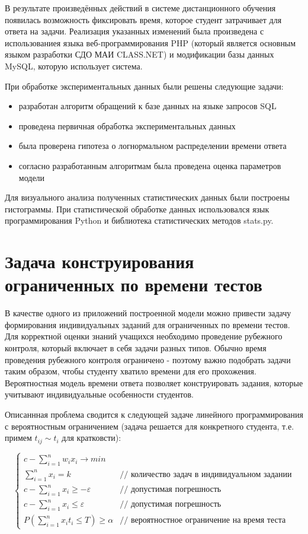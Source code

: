 В результате произведённых действий в системе дистанционного обучения появилась возможность фиксировать время, которое студент затрачивает для ответа на задачи. Реализация указанных изменений была произведена с ис\-пользованиея языка веб-программирования PHP (который является основным языком разработки СДО МАИ CLASS.NET) и модификации базы данных MySQL, которую использует система.

При обработке экспериментальных данных были решены следующие за\-дачи:

\begin{itemize}
\item разработан алгоритм обращений к базе данных на языке запросов SQL
\item проведена первичная обработка экспериментальных данных
\item была проверена гипотеза о логнормальном распределении времени от\-вета
\item согласно разработанным алгоритмам была проведена оценка парамет\-ров модели
\end{itemize}

Для визуального анализа полученных статистических данных были пос\-троены гисто\-граммы. При статистической обработке данных использовался язык программирования Python и библиотека статистических методов stats.py.

\section{Задача конструирования ограниченных по времени тестов}

В качестве одного из приложений построенной модели можно привести задачу формирования индивидуальных заданий для ограниченных по вре\-мени тестов. Для корректной оценки знаний учащихся необходимо проведение ру\-бежного контроля, который включает в себя задачи разных типов. Обычно время проведения рубежного контроля ограничено - поэтому важно подобрать задачи таким образом, чтобы студенту хватило времени для его прохожения. Вероятностная модель времени ответа позволяет конструировать задания, которые учитывают индивидуальные особенности студентов.

Описаннная проблема сводится к следующей задаче линейного програм\-мирования с вероятностным ограничением (задача решается для конкретного студента, т.е. примем $t_{ij} \sim t_i$ для кратковсти):

$$
\left \{
\begin{array}{ll}
c-\sum\limits_{i=1}^{n}w_ix_i \rightarrow min & \\
\sum\limits_{i=1}^{n} x_i = k & \mbox{// количество задач в индивидуальном задании}\\
c - \sum\limits_{i=1}^{n} x_i \ge - \varepsilon & \mbox{// допустимая погрешность}\\
c - \sum\limits_{i=1}^{n} x_i \le \varepsilon & \mbox{// допустимая погрешность}\\
P\left( \sum\limits_{i=1}^{n} x_i t_{i} \le T \right) \ge \alpha & \mbox{// вероятностное ограничение на время теста}
\end{array}
\right.
$$

